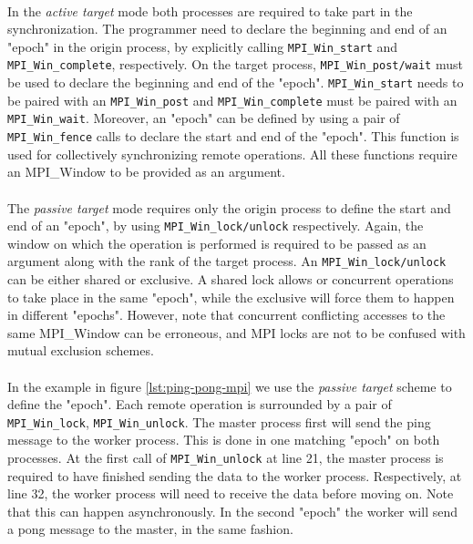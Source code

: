 \paragraph{}
In the \emph{active target} mode both processes are required to take part in the synchronization.  The programmer 
need to declare the beginning and end of an "epoch" in the origin process, by explicitly calling 
\texttt{MPI\_Win\_start} and \texttt{MPI\_Win\_complete}, respectively.
On the target process, \texttt{MPI\_Win\_post/wait} must be used to declare the beginning and end of the "epoch".
\texttt{MPI\_Win\_start} needs
to be paired with an \texttt{MPI\_Win\_post} and \texttt{MPI\_Win\_complete} must be paired with an \texttt{MPI\_Win\_wait}.  
Moreover, an "epoch" can be defined by using a pair of \texttt{MPI\_Win\_fence} calls to declare the start and end of the 
"epoch".  This function is used for collectively synchronizing remote operations.  
All these functions require an MPI\_Window to be provided as an argument. 

\paragraph{}
The \emph{passive target} mode requires only the origin process to define the start and end of an "epoch", by using 
\texttt{MPI\_Win\_lock/unlock} respectively.  Again, the window on which the operation is performed is required to be passed as
an argument along with the rank of the target process.  An \texttt{MPI\_Win\_lock/unlock} can be either shared or exclusive.
A shared lock allows or concurrent operations to take place in the same "epoch", while the exclusive will force them
to happen in different "epochs".  However, note that concurrent conflicting accesses to the same MPI\_Window can be 
erroneous, and MPI locks are not to be confused with mutual exclusion schemes.

\paragraph{}
In the example in figure \ref{lst:ping-pong-mpi} we use the \emph{passive target} scheme to define the "epoch".
Each remote operation is surrounded by a pair of \texttt{MPI\_Win\_lock}, \texttt{MPI\_Win\_unlock}.
The master process first will send
the ping message to the worker process.   This is done in one matching "epoch" on both processes.  At the first call 
of \texttt{MPI\_Win\_unlock} at line 21, the master process is required to have finished sending the data to the worker
process.   Respectively, at line 32, the worker process will need to receive the data before moving on.  Note that this
can happen asynchronously.  In the second "epoch" the worker will send a pong message to the master, in the same fashion.

